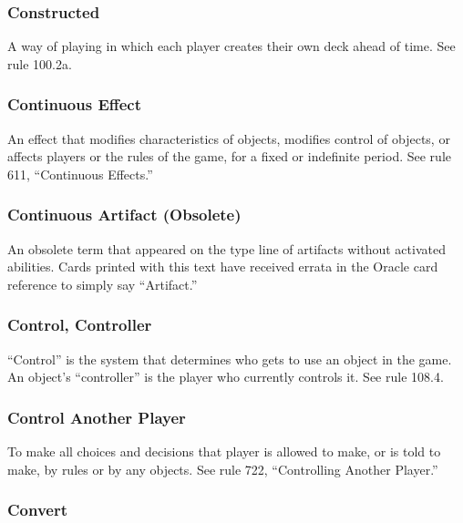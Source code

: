 {{{{{{\subsubsection*{Constructed}

A way of playing in which each player creates their own deck ahead of time. See rule 100.2a.

\subsubsection*{Continuous Effect}

An effect that modifies characteristics of objects, modifies control of objects, or affects players or the rules of the game, for a fixed or indefinite period. See rule 611, “Continuous Effects.”

\subsubsection*{Continuous Artifact (Obsolete)}

An obsolete term that appeared on the type line of artifacts without activated abilities. Cards printed with this text have received errata in the Oracle card reference to simply say “Artifact.”

\subsubsection*{Control, Controller}

“Control” is the system that determines who gets to use an object in the game. An object’s “controller” is the player who currently controls it. See rule 108.4.

\subsubsection*{Control Another Player}

To make all choices and decisions that player is allowed to make, or is told to make, by rules or by any objects. See rule 722, “Controlling Another Player.”

\subsubsection*{Convert}

}}}}}}
